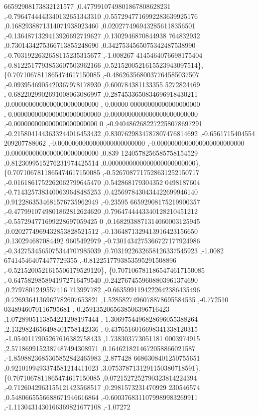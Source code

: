 \begin{DoxyCode}
      66592908173832121577 ,0.4779910749801867808628231 ,-0.7964744443340132651343310 ,0.5572947716992283639925176
       ,0.1682938871314071938023460 ,0.0202774969432856118356501 ,-0.1364871329413926692719627 ,0.1302946870844938
      764832932 ,0.7301434275366713855248690 ,0.3427534565075342487538990 ,-0.7031922632658115235315677 ,-1.008267
      4145464076698175404 ,-0.8122517793853607503962166 ,0.5215200521615523943097514\},
\{0.7071067811865474617150085 ,-0.4862635680037764585037507 ,-0.0939546905420367978178930 ,0.600784381133355
      5272824469 ,-0.6822029902691008063086997 ,0.2874533650834696918430211 ,0.0000000000000000000000000 ,-0.00000
      00000000000000000000 ,-0.0000000000000000000000000 ,0.0000000000000000000000000 ,-0.000000000000000000000000
      0 ,-0.9404862682272258078697291 ,-0.2158041443633244016453432 ,0.8307629834787807476814692 ,-0.6561715404554
      209207788062 ,-0.0000000000000000000000000 ,-0.0000000000000000000000000 ,0.0000000000000000000000000 ,0.839
      1240578256585758154529 ,0.8123099515276231974425514 ,0.0000000000000000000000000\},
\{0.7071067811865474617150085 ,-0.5267087717528631252150717 ,-0.0161861752262062799645470 ,0.542868179304352
      0498187604 ,-0.7143257383400639648485253 ,0.4256978430434422699946140 ,0.9122863534681576735962949 ,-0.23595
      66592908175219900357 ,-0.4779910749801862812624620 ,0.7964744443340128210451212 ,-0.557294771699228697059425
      0 ,0.1682938871314060003125945 ,0.0202774969432853828521512 ,-0.1364871329413916423156650 ,0.130294687084492
      9605492979 ,-0.7301434275366727177924986 ,-0.3427534565075344707985039 ,0.7031922632658126337545923 ,-1.0082
      674145464074477729355 ,-0.8122517793853595291508896 ,-0.5215200521615506179529120\},
\{0.7071067811865474617150085 ,-0.6475829858941972716479540 ,0.2427674559608803961374690 ,0.2797801249557416
      713997782 ,-0.6635991194222642386435496 ,0.7269364136962782607653821 ,1.5285827496078878695584535 ,-0.772510
      0348946070116795681 ,-0.2591352065638506396716423 ,1.0728905113854221298197444 ,-1.3069754496828696055388264
       ,2.1329824656498401758142336 ,-0.4376516016698341338120315 ,-1.0540117905267616382758433 ,1.738303773051181
      0003974915 ,2.5718699152387487494308971 ,0.1646218214672058866021587 ,-1.8598823685365852842465983 ,2.877428
      6686308401250755651 ,0.9210199493374581214411023 ,3.0753787131291150380718591\},
\{0.7071067811865474617150085 ,0.0721527252790323814224394 ,-0.7126042963155121423568517 ,0.2981573231470929
      230546574 ,0.5480665556688671946616864 ,-0.6003768311079989983269911 ,-1.1130431430166369821677108 ,-1.07272

\end{DoxyCode}
